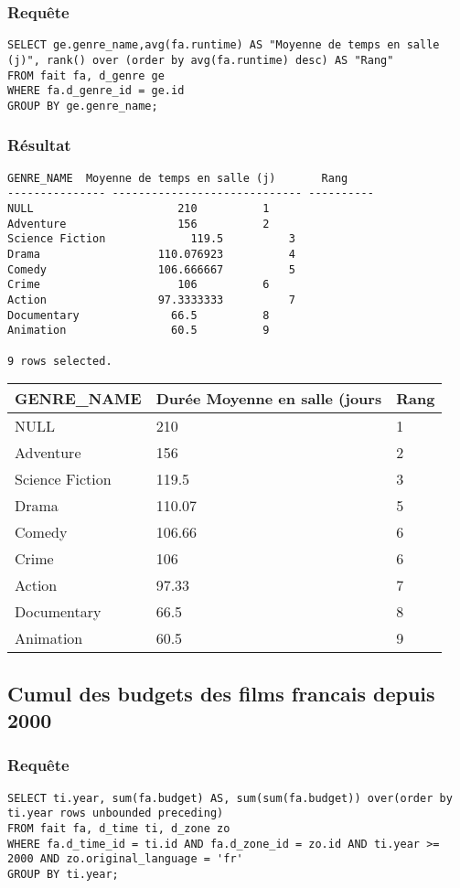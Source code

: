 \subsubsection{Requête}
\begin{lstlisting}
SELECT ge.genre_name,avg(fa.runtime) AS "Moyenne de temps en salle (j)", rank() over (order by avg(fa.runtime) desc) AS "Rang"
FROM fait fa, d_genre ge
WHERE fa.d_genre_id = ge.id
GROUP BY ge.genre_name;
\end{lstlisting}
\subsubsection{Résultat}
\begin{lstlisting}
GENRE_NAME	Moyenne de temps en salle (j)	    Rang
--------------- ----------------------------- ----------
NULL					  210	       1
Adventure				  156	       2
Science Fiction 			119.5	       3
Drama				   110.076923	       4
Comedy				   106.666667	       5
Crime					  106	       6
Action				   97.3333333	       7
Documentary				 66.5	       8
Animation				 60.5	       9

9 rows selected.
\end{lstlisting}

\begin{table}[]
	\centering
	\begin{tabular}{| l | l | l |}
		\hline
		GENRE\_NAME     & Durée Moyenne en salle (jours & Rang \\
		\hline
		NULL            & 210                           & 1  \\
		Adventure       & 156                           & 2 \\
		Science Fiction & 119.5                         & 3  \\
		Drama & 110.07 & 5 \\
		Comedy & 106.66 & 6 \\
		Crime & 106 & 6 \\
		Action & 97.33 & 7 \\
		Documentary & 66.5 & 8 \\
		Animation & 60.5 & 9 \\ 
		\hline
	\end{tabular}
\end{table}

\subsection{Cumul des budgets des films francais depuis 2000}
\subsubsection{Requête}
\begin{lstlisting}
SELECT ti.year, sum(fa.budget) AS, sum(sum(fa.budget)) over(order by ti.year rows unbounded preceding)
FROM fait fa, d_time ti, d_zone zo
WHERE fa.d_time_id = ti.id AND fa.d_zone_id = zo.id AND ti.year >= 2000 AND zo.original_language = 'fr'
GROUP BY ti.year;
\end{lstlisting}
